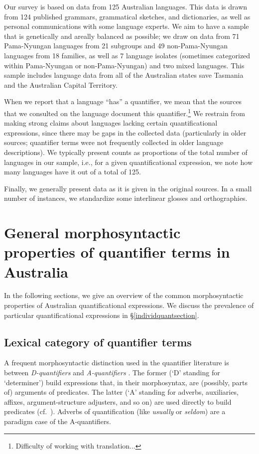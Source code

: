 \documentclass[12pt,egregdoesnotlikesansseriftitles]{scrartcl}
\begin{document}
Our survey is based on data from 125 Australian languages. This data is drawn from 124 published grammars, grammatical sketches, and dictionaries, as well as personal communications with some language experts. We aim to have a sample that is genetically and areally balanced as possible; we draw on data from 71 Pama-Nyungan languages from 21 subgroups and 49 non-Pama-Nyungan languages from 18 families, as well as 7 language isolates (sometimes categorized within Pama-Nyungan or non-Pama-Nyungan) and two mixed languages. This sample includes language data from all of the Australian states save Tasmania and the Australian Capital Territory.

When we report that a language ``has'' a quantifier, we mean that the sources that we consulted on the language document this quantifier.\footnote{Difficulty of working with translation...} We restrain from making strong claims about languages lacking certain quantificational
expressions, since there may be gaps in the collected data (particularly in older sources; quantifier terms were not frequently collected in older language descriptions). We typically present counts as proportions of the total number of languages in our sample, i.e., for a given quantificational expression, we note how many languages have it out of a total of 125.

Finally, we generally present data as it is given in the original sources. In a small number of  instances, we standardize some interlinear glosses and orthographies.


\section{General morphosyntactic properties of  quantifier terms in Australia}

In the following sections, we give an overview of the common morphosyntactic properties of Australian quantificational expressions. We discuss the prevalence of particular quantificational expressions in \S\ref{individquantsection}.

\subsection{Lexical category of quantifier terms}
A frequent morphosyntactic distinction used in the quantifier literature is between \textit{D-quantifiers} and \textit{A-quantifiers} \citep{partee95}. %
The former (`D' standing for `determiner') build expressions that, in their morphosyntax, are (possibly, parts of) arguments of predicates. The latter (`A' standing for adverbs, auxiliaries, affixes, argument-structure adjusters, and so on) are used directly to build predicates (cf.\ \citealt{keenan17qu}). Adverbs of quantification (like \textit{usually} or \textit{seldom}) are a paradigm case of the A-quantifiers.
\end{document}
